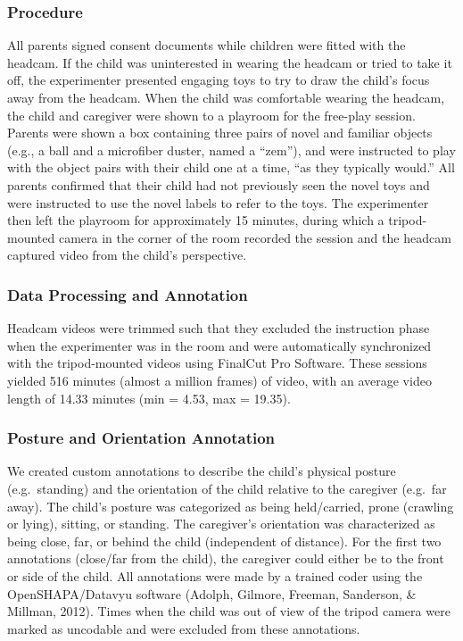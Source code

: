 \documentclass[10pt, letterpaper]{article}
\begin{document}
\subsubsection{Procedure}\label{procedure}

All parents signed consent documents while children were fitted with the
headcam. If the child was uninterested in wearing the headcam or tried
to take it off, the experimenter presented engaging toys to try to draw
the child's focus away from the headcam. When the child was comfortable
wearing the headcam, the child and caregiver were shown to a playroom
for the free-play session. Parents were shown a box containing three
pairs of novel and familiar objects (e.g., a ball and a microfiber
duster, named a ``zem''), and were instructed to play with the object
pairs with their child one at a time, ``as they typically would.'' All
parents confirmed that their child had not previously seen the novel
toys and were instructed to use the novel labels to refer to the toys.
The experimenter then left the playroom for approximately 15 minutes,
during which a tripod-mounted camera in the corner of the room recorded
the session and the headcam captured video from the child's perspective.

\subsubsection{Data Processing and
Annotation}\label{data-processing-and-annotation}

Headcam videos were trimmed such that they excluded the instruction
phase when the experimenter was in the room and were automatically
synchronized with the tripod-mounted videos using FinalCut Pro Software.
These sessions yielded 516 minutes (almost a million frames) of video,
with an average video length of 14.33 minutes (min = 4.53, max = 19.35).

\subsubsection{Posture and Orientation
Annotation}\label{posture-and-orientation-annotation}

We created custom annotations to describe the child's physical posture
(e.g.~standing) and the orientation of the child relative to the
caregiver (e.g.~far away). The child's posture was categorized as being
held/carried, prone (crawling or lying), sitting, or standing. The
caregiver's orientation was characterized as being close, far, or behind
the child (independent of distance). For the first two annotations
(close/far from the child), the caregiver could either be to the front
or side of the child. All annotations were made by a trained coder using
the OpenSHAPA/Datavyu software (Adolph, Gilmore, Freeman, Sanderson, \&
Millman, 2012). Times when the child was out of view of the tripod
camera were marked as uncodable and were excluded from these
annotations.
\end{document}
